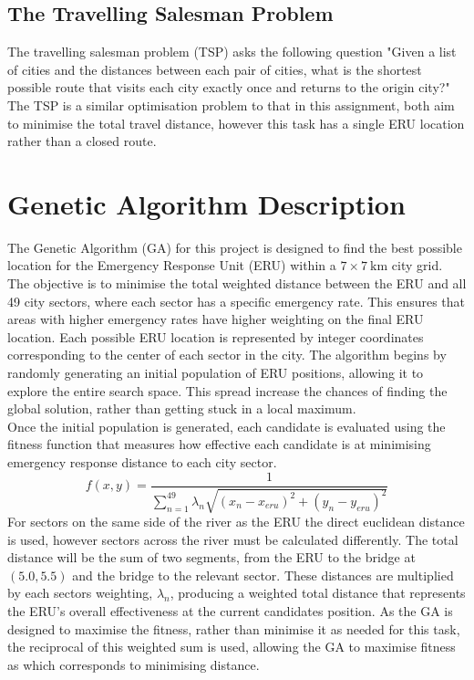 \documentclass[12pt,a4paper]{article}
\begin{document}
\subsection{The Travelling Salesman Problem}
The travelling salesman problem (TSP) asks the following question "Given a list of cities and the distances between each pair of cities, what is the shortest possible route that visits each city exactly once and returns to the origin city?" The TSP is a similar optimisation problem to that in this assignment, both aim to minimise the total travel distance, however this task has a single ERU location rather than a closed route. 
\section{Genetic Algorithm Description}
The Genetic Algorithm (GA) for this project is designed to find the best possible location for the Emergency Response Unit (ERU) within a $7\times 7\:\text{km}$ city grid. The objective is to minimise the total weighted distance between the ERU and all 49 city sectors, where each sector has a specific emergency rate. This ensures that areas with higher emergency rates have higher weighting on the final ERU location. Each possible ERU location is represented by integer coordinates corresponding to the center of each sector in the city. The algorithm begins by randomly generating an initial population of ERU positions, allowing it to explore the entire search space. This spread increase the chances of finding the global solution, rather than getting stuck in a local maximum.\\

Once the initial population is generated, each candidate is evaluated using the fitness function that measures how effective each candidate is at minimising emergency response distance to each city sector. 
$$f(x,y)=\dfrac{1}{\sum_{n=1}^{49}\lambda_n\sqrt{(x_n-x_{eru})^2+(y_n-y_{eru})^2}}$$
For sectors on the same side of the river as the ERU the direct euclidean distance is used, however sectors across the river must be calculated differently. The total distance will be the sum of two segments, from the ERU to the bridge at $(5.0,5.5)$ and the bridge to the relevant sector. These distances are multiplied by each sectors weighting, $\lambda_n$, producing a weighted total distance that represents the ERU's overall effectiveness at the current candidates position. As the GA is designed to maximise the fitness, rather than minimise it as needed for this task, the reciprocal of this weighted sum is used,  allowing the GA to maximise fitness as which corresponds to minimising distance.\\
\end{document}
